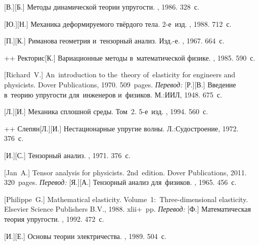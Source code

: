 \begin{thebibliography}{123}
\begin{otherlanguage}{russian}
[В.][Б.] Методы динамической теории упругости. \naukapublisher, 1986. 328~с.

[Ю.][Н.] Механика деформируемого твёрдого тела. 2\hbox{-}е~изд. \naukapublisher, 1988. 712~с.

[П.][К.] Риманова геометрия и~тензорный анализ. Изд.\hbox{-}е. \naukapublisher, 1967. 664~с.

++ {Ректорис}[К.] Вариационные методы в~математической физике. \mirpublisher, 1985. 590~с.

[Richard~V.] An~introduction to the~theory of~elasticity for engineers and physicists. Dover Publications, 1970. 509~pages.
\emph{Перевод:} [Р.][В.] Введение в~теорию упругости для~инженеров и~физиков. М.:\;ИИЛ, 1948. 675~с.

[Л.][И.] Механика сплошной среды. Том~2. 5\hbox{-}е~изд. \naukapublisher, 1994. 560~с.

++ {Слепян}[Л.][И.] Нестационарные упругие волны. Л.:\;Судостроение, 1972. 376~с.

[И.][С.] Тензорный анализ. \naukapublisher, 1971. 376~с.

[Jan~A.] Tensor analysis for physicists. 2nd~edition. Dover Publications, 2011. 320~pages.
\emph{Перевод:} [Я.][А.] Тензорный анализ для~физиков. \naukapublisher, 1965. 456~с.

[Philippe~G.] Mathematical elasticity. Volume~1:~Three\hbox{-}di\-men\-sion\-al elasticity. Elsevier Science Publishers B.\hspace{.1ex}V., 1988. xlii\:+~pp. %
\emph{Перевод:} [Ф.] Математическая теория упругости. \mirpublisher, 1992. 472~с.

[И.][Е.] Основы теории электричества. \naukapublisher, 1989. 504~с.


\end{otherlanguage}
\end{thebibliography}
